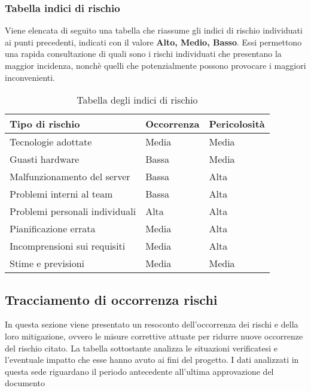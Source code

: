 \begin{minipage}{\linewidth}
	
\subsubsection{Tabella indici di rischio}

Viene elencata di seguito una tabella che riassume gli indici di rischio individuati ai punti precedenti, indicati con il valore \textbf{Alto, Medio, Basso}. Essi permettono una rapida consultazione di quali sono i rischi individuati che presentano la maggior incidenza, nonchè quelli che potenzialmente possono provocare i maggiori inconvenienti. 

\begin{table}[H]
	\begin{center}
		\begin{tabular}{|p{5cm} | p{5cm} | p{5cm}|}
			\hline
			\textbf{Tipo di rischio}	& \textbf{Occorrenza} & \textbf{Pericolosità}\\
			\hline
			Tecnologie adottate	&	Media 	& 	Media	\\
			\hline
			Guasti hardware	&	Bassa 	& 	Media	\\
			\hline
			Malfunzionamento del server	&	Bassa 	& 	Alta	\\
			\hline
			Problemi interni al team	&	Bassa 	& 	Alta	\\
			\hline
			Problemi personali individuali	&	Alta 	& 	Alta	\\
			\hline
			Pianificazione errata	&	Media 	& 	Alta	\\
			\hline
			Incomprensioni sui requisiti	&	Media 	& 	Alta	\\
			\hline
			Stime e previsioni	&	Media 	& 	Media	\\
			\hline
		\end{tabular}
		\caption{Tabella degli indici di rischio}
	\end{center}
\end{table}
\end{minipage}

\subsection{Tracciamento di occorrenza rischi}
In questa sezione viene presentato un resoconto dell'occorrenza dei rischi e della loro mitigazione, ovvero le misure correttive attuate per ridurre nuove occorrenze del rischio citato. La tabella sottostante analizza le situazioni verificatesi e l'eventuale impatto che esse hanno avuto ai fini del progetto. I dati analizzati in questa sede riguardano il periodo antecedente all'ultima approvazione del documento

